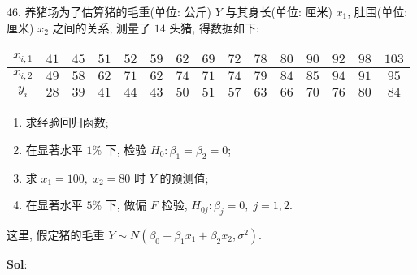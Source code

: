 \vspace{12pt}


46. 养猪场为了估算猪的毛重(单位: 公斤) $Y$ 与其身长(单位: 厘米) $x_1$, 肚围(单位: 厘米) $x_2$ 之间的关系, 测量了 $14$ 头猪, 得数据如下:

\begin{center}
    \begin{tabular}{c|cccccccccccccc}
        \hline
        $x_{i,1}$ & $41$ & $45$ & $51$ & $52$ & $59$ & $62$ & $69$ & $72$ & $78$ & $80$ & $90$ & $92$ & $98$ & $103$\\
        \hline
        $x_{i,2}$ & $49$ & $58$ & $62$ & $71$ & $62$ & $74$ & $71$ & $74$ & $79$ & $84$ & $85$ & $94$ & $91$ & $95$\\ 
        \hline
        $y_{i}$   & $28$ & $39$ & $41$ & $44$ & $43$ & $50$ & $51$ & $57$ & $63$ & $66$ & $70$ & $76$ & $80$ & $84$\\
        \hline
    \end{tabular}
\end{center}

\begin{enumerate}[(1)]
    \item 求经验回归函数;
    \item 在显著水平 $1\%$ 下, 检验 $H_0:\beta_1=\beta_2=0$;
    \vspace{48pt}
    \item 求 $x_1=100,\;x_2=80$ 时 $Y$ 的预测值;
    \item 在显著水平 $5\%$ 下, 做偏 $F$ 检验, $H_{0j}:\beta_j=0,\;j=1,2$.
\end{enumerate}

这里, 假定猪的毛重 $Y\sim N(\beta_0+\beta_1x_1+\beta_2x_2,\sigma^2)$.

\textbf{Sol}:  

